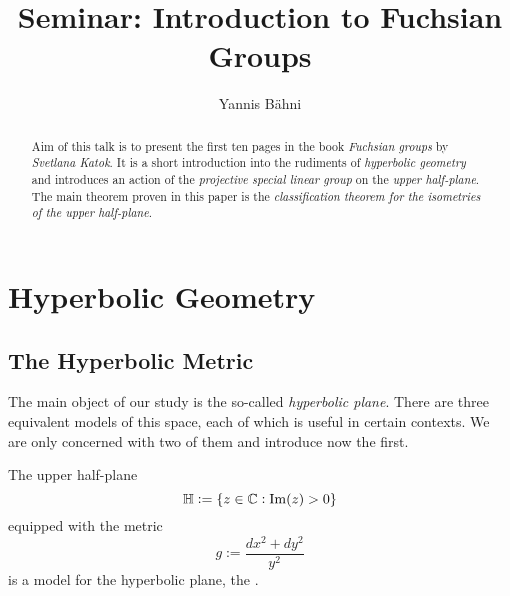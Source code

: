 

\title{Seminar: Introduction to Fuchsian Groups}
\author{Yannis B\"{a}hni}
\address[Yannis B\"{a}hni]{University of Zurich, R\"{a}mistrasse 71, 8006 Zurich}



\maketitle

\begin{abstract}
	Aim of this talk is to present the first ten pages in the book \emph{Fuchsian groups} by \emph{Svetlana Katok}. It is a short introduction into the rudiments of \emph{hyperbolic geometry} and introduces an action of the \emph{projective special linear group} on the \emph{upper half-plane}. The main theorem proven in this paper is the \emph{classification theorem for the isometries of the upper half-plane}.
\end{abstract}

\tableofcontents

\section{Hyperbolic Geometry}
\subsection{The Hyperbolic Metric}
The main object of our study is the so-called \emph{hyperbolic plane}. There are three equivalent models of this space, each of which is useful in certain contexts. We are only concerned with two of them and introduce now the first. 

\begin{definition}
	The upper half-plane
	\begin{equation}
		\Hbb := \cbr[0]{z \in \Cbb : \Im(z) > 0}
	\end{equation}
	\noindent equipped with the metric
	\begin{equation}
		g := \frac{dx^2 + dy^2}{y^2}
	\end{equation}
	\noindent is a model for the hyperbolic plane, the .
	\label{def:half_space_model}
\end{definition}

